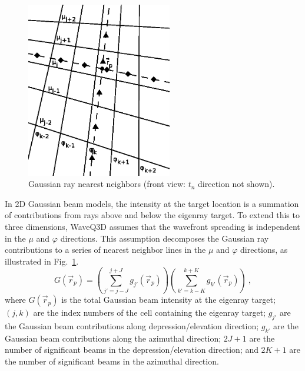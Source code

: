 \documentclass{ws-jca}
\newcommand{\twoD}{2\nobreakdash\textendash D }	%
\begin{document}
\begin{figure}[th]
	\centerline{\includegraphics[width=2.5in]{GaussianGeometry.eps}} 
	\vspace*{8pt}
	\caption{Gaussian ray nearest neighbors 
		(front view: \(t_n\) direction not shown).}
	\label{fig:ray_neighbors}
\end{figure}
In \twoD Gaussian beam models, the intensity at the target location is a summation of contributions from rays above and below the eigenray target. To extend this to three dimensions, WaveQ3D assumes that the wavefront spreading is independent in the \(\mu\) and \(\varphi\) directions. This assumption decomposes the Gaussian ray contributions to a series of nearest neighbor lines in the \(\mu\) and \(\varphi\) directions, as illustrated in Fig.~\ref{fig:ray_neighbors}.
\begin{equation}
	G(\vec{r}_p) = \left( \sum_{j'=j-J}^{j+J} g_{j'}(\vec{r}_p)\right) 
		\left( \sum_{k'=k-K}^{k+K} g_{k'}(\vec{r}_p)\right) \:,
	\label{eq:gaussian_sum}
\end{equation}
where
\(G(\vec{r}_p)\) is the total Gaussian beam intensity at the eigenray target;
$(j,k)$ are the index numbers of the cell containing the eigenray target;
\(g_{j'}\) are the Gaussian beam contributions along depression/elevation direction;
\(g_{k'}\) are the Gaussian beam contributions along the azimuthal direction;
$2J+1$ are the number of significant beams in the depression/elevation direction; and
$2K+1$ are the number of significant beams in the azimuthal direction.
\end{document}

